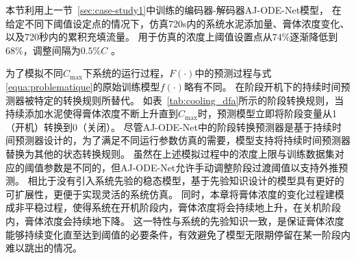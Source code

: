 本节利用上一节~\ref{sec:case-study1}中训练的编码器-解码器AJ-ODE-Net模型，
在给定不同下阈值设定点的情况下，仿真720s内的系统水泥添加量、膏体浓度变化、以及720秒内的累积充填流量。
用于仿真的浓度上阈值设置点从$74\%$逐渐降低到$68\%$，调整间隔为$0.5\%C$ 。

为了模拟不同$C_{\max}$下系统的运行过程，$F(\cdot)$中的预测过程与式\ref{equa:problematique}的原始训练模型$f(\cdot)$略有不同。
在阶段开机下的持续时间预测器被特定的转换规则所替代。
如表~\ref{tab:cooling_dfa}所示的阶段转换规则，当持续添加水泥使得膏体浓度不断上升直到$C_{\max}$时，预测模型立即将阶段变量从1（开机）转换到0（关闭）。
尽管AJ-ODE-Net中的阶段转换预测器是基于持续时间预测器设计的，为了满足不同运行参数仿真的需要，模型支持将持续时间预测器替换为其他的状态转换规则。
虽然在上述模拟过程中的浓度上限与训练数据集对应的阈值参数是不同的，但AJ-ODE-Net允许手动调整阶段过渡阈值以支持外推预测。
相比于没有引入系统先验的稳态模型，基于先验知识设计的模型具有更好的可扩展性，更便于实现灵活的系统仿真。
同时，本章将膏体浓度的变化过程建模成非平稳过程，使得系统在开机阶段内，膏体浓度将会持续地上升，在关机阶段内，膏体浓度会持续地下降。
这一特性与系统的先验知识一致，是保证膏体浓度能够持续变化直至达到阈值的必要条件，有效避免了模型无限期停留在某一阶段内难以跳出的情况。

